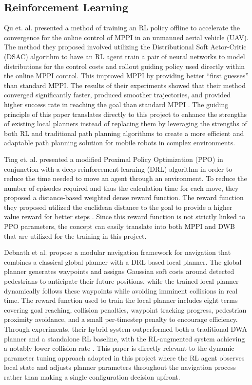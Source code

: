 \documentclass[conference]{IEEEtran}
\begin{document}
        \subsection{Reinforcement Learning}
        Qu et. al. presented a method of training an RL policy offline to accelerate the convergence for the online control of MPPI in an unmanned
        aerial vehicle (UAV). The method they proposed involved utilizing the Distributional Soft Actor-Critic (DSAC) algorithm to have an RL agent
        train a pair of neural networks to model distributions for the control costs and rollout guiding policy used directly within the online MPPI
        control. This improved MPPI by providing better ``first guesses'' than standard MPPI. The results of their experiments showed that their
        method converged significantly faster, produced smoother trajectories, and provided higher success rate in reaching the goal than standard
        MPPI \cite{b3}. The guiding principle of this paper translates directly to this project to enhance the strengths of existing local planners
        instead of replacing them by leveraging the strengths of both RL and traditional path planning algorithms to create a more efficient and 
        adaptable path planning solution for mobile robots in complex environments.

        Ting et. al. presented a modified Proximal Policy Optimization (PPO) in conjunction with a deep reinforcement learning (DRL) algorithm in
        order to reduce the time needed to move an agent through an environment. To reduce the number of episodes required and thus the calculation
        time for each move, they proposed a distance-based weighted dense reward function. The reward function they proposed utilized the euclidean
        distance to the goal to provide a higher value reward for better steps \cite{b4}. Since this reward function is not strictly linked to PPO
        parameters, the concept can easily translate into both MPPI and DWB that are utilized for the training in this project. 

        Debnath et al. propose a modular navigation framework for navigation that combines a classical global planner with a DRL based local planner.
        The global planner generates waypoints and assigns Gaussian soft costs around detected pedestrians to anticipate their future positions,
        while the trained local planner dynamically follows these waypoints while avoiding imminent collisions in real time. The reward function used
        to train the local planner includes eight terms covering goal reaching, collision penalties, waypoint tracking progress, pedestrian proximity
        avoidance, and a small per-timestep penalty to encourage efficiency. Through experiments, their hybrid system outperformed both a traditional
        DWA planner and a standalone RL baseline, with the RL-augmented system achieving a notably lower collision rate \cite{b9}. This paper is
        directly relevant to the dynamic parameter tuning approach adopted in this project where the RL agent observes local state and adjusts planner
        parameters throughout the navigation process rather than making a single configuration decision upfront.
\end{document}
